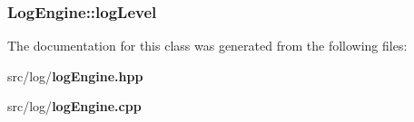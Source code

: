 \subsubsection{ {\bf Log\-Engine::log\-Level}\hspace{0.3cm}{\tt  [private]}}\label{classLogEngine_r1}




The documentation for this class was generated from the following files:\begin{CompactItemize}
\item 
src/log/{\bf log\-Engine.hpp}\item 
src/log/{\bf log\-Engine.cpp}\end{CompactItemize}
